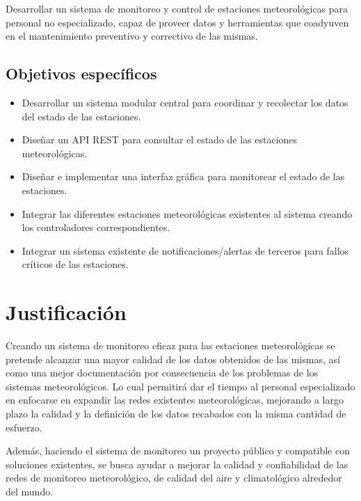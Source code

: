 Desarrollar un sistema de monitoreo y control de estaciones meteorológicas para personal no especializado, capaz de proveer datos y herramientas que coadyuven en el mantenimiento preventivo y correctivo de las mismas.

\subsection{Objetivos específicos}

\begin{itemize}
   \item Desarrollar un sistema modular central para coordinar y recolectar los datos del estado de las estaciones.

   \item Diseñar un API REST para consultar el estado de las estaciones meteorológicas.


   \item Diseñar e implementar una interfaz gráfica para monitorear el estado de las estaciones.

   \item Integrar las diferentes estaciones meteorológicas existentes al sistema creando los controladores correspondientes.

   \item Integrar un sistema existente de notificaciones/alertas de terceros para fallos críticos de las estaciones.
\end{itemize}

\section{Justificación}

Creando un sistema de monitoreo eficaz para las estaciones meteorológicas se pretende alcanzar una mayor calidad de los datos obtenidos de las mismas, así como una mejor documentación por consecuencia de los problemas de los sistemas meteorológicos. Lo cual permitirá dar el tiempo al personal especializado en enfocarse en expandir las redes existentes meteorológicas, mejorando a largo plazo la calidad y la definición de los datos recabados con la misma cantidad de esfuerzo.

Además, haciendo el sistema de monitoreo un proyecto público y compatible con soluciones existentes, se busca ayudar a mejorar la calidad y confiabilidad de las redes de monitoreo meteorológico, de calidad del aire y climatológico alrededor del mundo.

